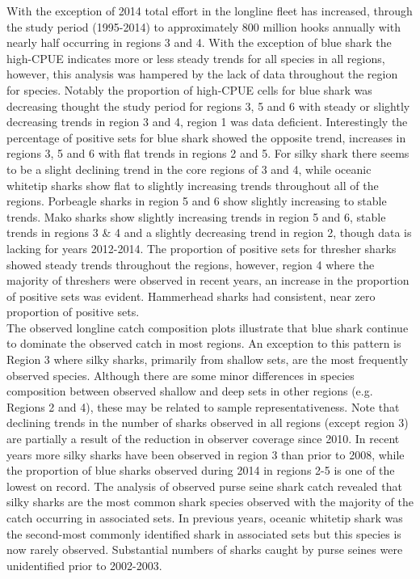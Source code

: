 \documentclass[12pt]{SCreport}
\begin{document}
With the exception of 2014 total effort in the longline fleet has increased, through the study period (1995-2014) to approximately 800 million hooks annually with nearly half occurring in regions 3 and 4. With the exception of blue shark the high-CPUE indicates more or less steady trends for all species in all regions, however, this analysis was hampered by the lack of data throughout the region for species. Notably the proportion of high-CPUE cells for blue shark was decreasing thought the study period for regions 3, 5 and 6 with steady or slightly decreasing trends in region 3 and 4, region 1 was data deficient. Interestingly the percentage of positive sets for blue shark showed the opposite trend, increases in regions 3, 5 and 6 with flat trends in regions 2 and 5. For silky shark there seems to be a slight declining trend in the core regions of 3 and 4, while oceanic whitetip sharks show flat to slightly increasing trends throughout all of the regions. Porbeagle sharks in region 5 and 6 show slightly increasing to stable trends. Mako sharks show slightly increasing trends in region 5 and 6, stable trends in regions 3 \& 4 and a slightly decreasing trend in region 2, though data is lacking for years 2012-2014. The proportion of positive sets for thresher sharks showed steady trends throughout the regions, however, region 4 where the majority of threshers were observed in recent years, an increase in the proportion of positive sets was evident. Hammerhead sharks had consistent, near zero proportion of positive sets. 
\\
The observed longline catch composition plots illustrate that blue shark continue to dominate the observed catch in most regions. An exception to this pattern is Region 3 where silky sharks, primarily from shallow sets, are the most frequently observed species. Although there are some minor differences in species composition between observed shallow and deep sets in other regions (e.g. Regions 2 and 4), these may be related to sample representativeness. Note that declining trends in the number of sharks observed in all regions (except region 3) are partially a result of the reduction in observer coverage since 2010. In recent years more silky sharks have been observed in region 3 than prior to 2008, while the proportion of blue sharks observed during 2014 in regions 2-5 is one of the lowest on record. The analysis of observed purse seine shark catch revealed that silky sharks are the most common shark species observed with the majority of the catch occurring in associated sets. In previous years, oceanic whitetip shark was the second-most commonly identified shark in associated sets but this species is now rarely observed. Substantial numbers of sharks caught by purse seines were unidentified prior to 2002-2003.
\end{document}
